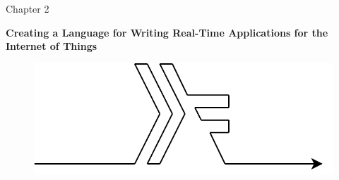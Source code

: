 \documentclass{article}
\begin{document}
\pagecolor{Emerald}

\setlength{\parindent}{0cm}
\LARGE
Chapter 2

\LARGE
\textbf{Creating a Language for Writing Real-Time Applications for the Internet of Things}

\vspace{5cm}

\begin{figure}[h]
    \centering
    \includegraphics[scale=0.35]{graphics/scoria-signal.png}
\end{figure}

\newpage
\mbox{~}
\end{document}
